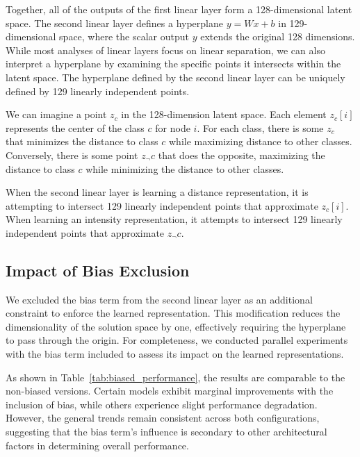Together, all of the outputs of the first linear layer form a 128-dimensional latent space. The second linear layer defines a hyperplane 
$y=Wx+b$ in 129-dimensional space, where the scalar output $y$ extends the original 128 dimensions. While most analyses of linear layers focus on linear separation, we can also interpret a hyperplane by examining the specific points it intersects within the latent space. The hyperplane defined by the second linear layer can be uniquely defined by 129 linearly independent points.

We can imagine a point $z_c$ in the 128-dimension latent space. Each element $z_c[i]$ represents the center of the class $c$ for node $i$. For each class, there is some $z_c$ that minimizes the distance to class $c$ while maximizing distance to other classes. Conversely, there is some point $z_\neg c$ that does the opposite, maximizing the distance to class $c$ while minimizing the distance to other classes. 

When the second linear layer is learning a distance representation, it is attempting to intersect 129 linearly independent points that approximate $z_c[i]$. When learning an intensity representation, it attempts to intersect 129 linearly independent points that approximate $z_\neg c$.

\subsection{Impact of Bias Exclusion}

We excluded the bias term from the second linear layer as an additional constraint to enforce the learned representation. This modification reduces the dimensionality of the solution space by one, effectively requiring the hyperplane to pass through the origin. For completeness, we conducted parallel experiments with the bias term included to assess its impact on the learned representations.

As shown in Table~\ref{tab:biased_performance}, the results are comparable to the non-biased versions. Certain models exhibit marginal improvements with the inclusion of bias, while others experience slight performance degradation. However, the general trends remain consistent across both configurations, suggesting that the bias term's influence is secondary to other architectural factors in determining overall performance.

